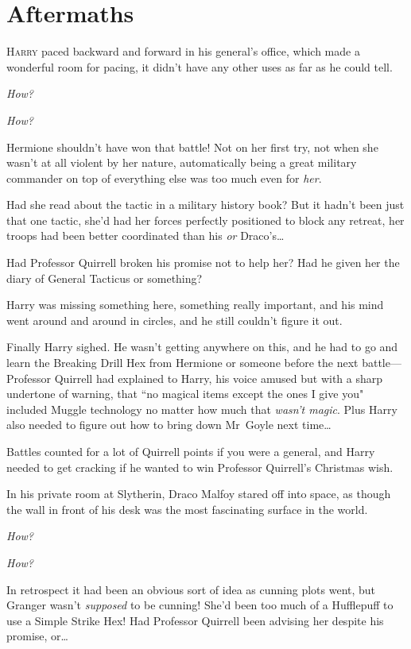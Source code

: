 
\section{Aftermaths}

\lettrine{H}{arry} paced backward and forward in his general's office, which made a wonderful room for pacing, it didn't have any other uses as far as he could tell.

\emph{How?}

\emph{How?}

Hermione shouldn't have won that battle! Not on her first try, not when she wasn't at all violent by her nature, automatically being a great military commander on top of everything else was too much even for \emph{her}.

Had she read about the tactic in a military history book? But it hadn't been just that one tactic, she'd had her forces perfectly positioned to block any retreat, her troops had been better coordinated than his \emph{or} Draco's{\ldots}

Had Professor Quirrell broken his promise not to help her? Had he given her the diary of General Tacticus or something?

Harry was missing something here, something really important, and his mind went around and around in circles, and he still couldn't figure it out.

Finally Harry sighed. He wasn't getting anywhere on this, and he had to go and learn the Breaking Drill Hex from Hermione or someone before the next battle—Professor Quirrell had explained to Harry, his voice amused but with a sharp undertone of warning, that ``no magical items except the ones I give you" included Muggle technology no matter how much that \emph{wasn't magic}. Plus Harry also needed to figure out how to bring down Mr~Goyle next time{\ldots}

Battles counted for a lot of Quirrell points if you were a general, and Harry needed to get cracking if he wanted to win Professor Quirrell's Christmas wish.

\later

In his private room at Slytherin, Draco Malfoy stared off into space, as though the wall in front of his desk was the most fascinating surface in the world.

\emph{How?}

\emph{How?}

In retrospect it had been an obvious sort of idea as cunning plots went, but Granger wasn't \emph{supposed} to be cunning! She'd been too much of a Hufflepuff to use a Simple Strike Hex! Had Professor Quirrell been advising her despite his promise, or{\ldots}

